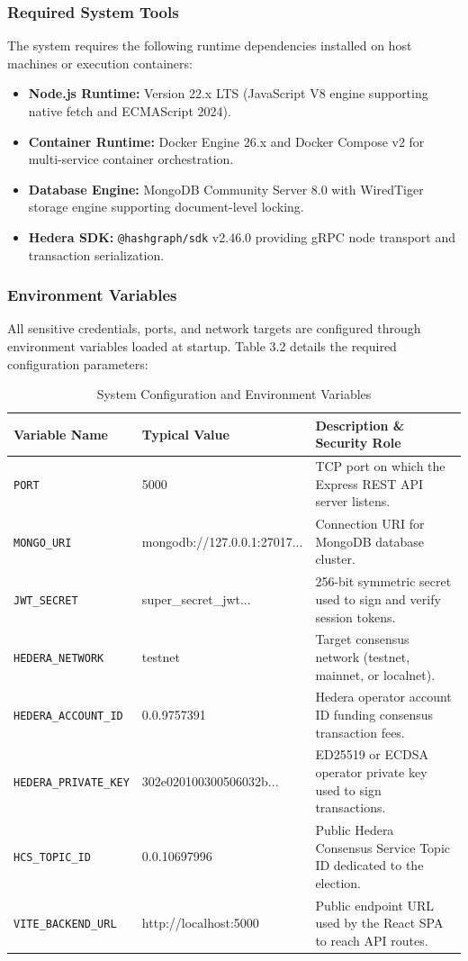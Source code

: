 \documentclass[12pt, a4paper]{article}
\begin{document}
\subsubsection{Required System Tools}
The system requires the following runtime dependencies installed on host machines or execution containers:
\begin{itemize}[leftmargin=*]
    \item \textbf{Node.js Runtime:} Version 22.x LTS (JavaScript V8 engine supporting native fetch and ECMAScript 2024).
    \item \textbf{Container Runtime:} Docker Engine 26.x and Docker Compose v2 for multi-service container orchestration.
    \item \textbf{Database Engine:} MongoDB Community Server 8.0 with WiredTiger storage engine supporting document-level locking.
    \item \textbf{Hedera SDK:} \texttt{@hashgraph/sdk} v2.46.0 providing gRPC node transport and transaction serialization.
\end{itemize}

\subsubsection{Environment Variables}
All sensitive credentials, ports, and network targets are configured through environment variables loaded at startup. Table 3.2 details the required configuration parameters:

\begin{table}[H]
    \centering
    \caption{System Configuration and Environment Variables}
    \label{tab:env_vars}
    \begin{tabularx}{\textwidth}{@{}l X X@{}}
        \toprule
        \textbf{Variable Name} & \textbf{Typical Value} & \textbf{Description \& Security Role} \\
        \midrule
        \texttt{PORT} & 5000 & TCP port on which the Express REST API server listens. \\
        \texttt{MONGO\_URI} & mongodb://127.0.0.1:27017... & Connection URI for MongoDB database cluster. \\
        \texttt{JWT\_SECRET} & super\_secret\_jwt... & 256-bit symmetric secret used to sign and verify session tokens. \\
        \texttt{HEDERA\_NETWORK} & testnet & Target consensus network (testnet, mainnet, or localnet). \\
        \texttt{HEDERA\_ACCOUNT\_ID} & 0.0.9757391 & Hedera operator account ID funding consensus transaction fees. \\
        \texttt{HEDERA\_PRIVATE\_KEY} & 302e020100300506032b... & ED25519 or ECDSA operator private key used to sign transactions. \\
        \texttt{HCS\_TOPIC\_ID} & 0.0.10697996 & Public Hedera Consensus Service Topic ID dedicated to the election. \\
        \texttt{VITE\_BACKEND\_URL} & http://localhost:5000 & Public endpoint URL used by the React SPA to reach API routes. \\
        \bottomrule
    \end{tabularx}
\end{table}
\end{document}
